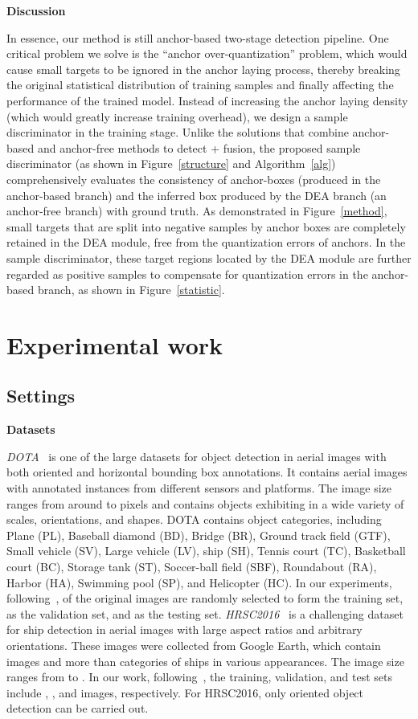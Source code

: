 \documentclass[journal]{IEEEtran}
\newcommand{\myparagraph}[1]{\vspace{0.1em}\noindent\textbf{#1}}
\begin{document}
\myparagraph{Discussion} 

In essence, our method is still anchor-based two-stage detection pipeline. 
One critical problem we solve is the “anchor over-quantization” problem, which would cause small targets to be ignored in the anchor laying process, thereby breaking the original statistical distribution of training samples and finally affecting the performance of the trained model.
Instead of increasing the anchor laying density (which would greatly increase training overhead), we design a sample discriminator in the training stage. Unlike the solutions that combine anchor-based and anchor-free methods to detect + fusion, the proposed sample discriminator (as shown in Figure~\ref{structure} and Algorithm~\ref{alg}) comprehensively evaluates the consistency of anchor-boxes (produced in the anchor-based branch) and the inferred box produced by the DEA branch (an anchor-free branch) with ground truth. As demonstrated in Figure~\ref{method}, small targets that are split into negative samples by anchor boxes are completely retained in the DEA module, free from the quantization errors of anchors. In the sample discriminator, these target regions located by the DEA module are further regarded as positive samples to compensate for quantization errors in the anchor-based branch, as shown in Figure~\ref{statistic}.

\section{Experimental work}
\subsection{Settings}
\myparagraph{Datasets} 

\emph{{DOTA}}~\cite{xia2018dota} is one of the large datasets for object detection in aerial images with both oriented and horizontal bounding box annotations. It contains  aerial images with  annotated instances from different sensors and platforms. The image size ranges from around  to  pixels and contains objects exhibiting in a wide variety of scales, orientations, and shapes. DOTA contains  object categories, including Plane (PL), Baseball diamond (BD), Bridge (BR), Ground track field (GTF), Small vehicle (SV), Large vehicle (LV), ship (SH), Tennis court (TC), Basketball court (BC), Storage tank (ST), Soccer-ball field (SBF), Roundabout (RA), Harbor (HA), Swimming pool (SP), and Helicopter (HC). In our experiments, following~\cite{xia2018dota,yang2019scrdet},  of the original images are randomly selected to form the training set,  as the validation set, and  as the testing set.
\emph{{HRSC2016}}~\cite{lb2017high} is a challenging dataset for ship detection in aerial images with large aspect ratios and arbitrary orientations. These images were collected from Google Earth, which contain  images and more than  categories of ships in various appearances. The image size ranges from  to . In our work, following~\cite{lb2017high}, the training, validation, and test sets include , , and  images, respectively. For HRSC2016, only oriented object detection can be carried out. 
\end{document}
